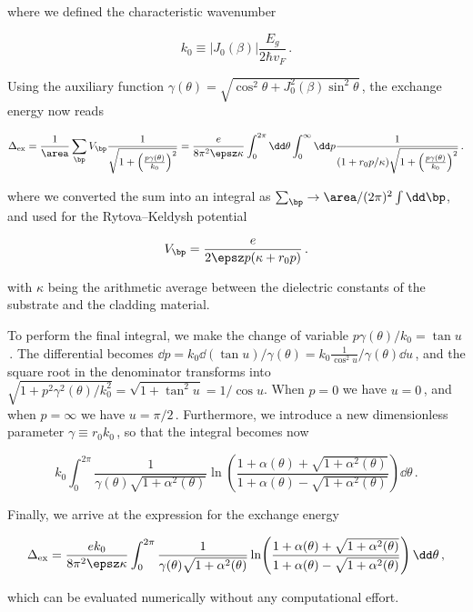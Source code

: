 \noindent where we defined the characteristic wavenumber

\begin{equation}
    k_0 \equiv |J_0 (\beta)| \frac{E_g}{2 \hbar v_F} \,.
\end{equation}

Using the auxiliary function $\gamma(\theta) = \sqrt{\cos^2 \theta + J_0^2(\beta) \sin^2 \theta}$\,, the exchange energy now reads

\begin{equation}
    \Delta_{\mathrm{ex}} = \frac{1}{\area} \sum_{\bp} V_{\bp}  \frac{1}{\sqrt{1 + \left(\frac{p \gamma(\theta)}{k_0}\right)^2}} = \frac{e}{8 \pi^2 \epsz \kappa} \int_0^{2\pi} \dd \theta \int_0^{\infty} \dd p  \frac{1}{ (1 + r_0 p/\kappa) \sqrt{1 + \left(\frac{p \gamma(\theta)}{k_0}\right)^2}} \,.
\end{equation}

\noindent where we converted the sum into an integral as $\sum_{\bp} \to \area/(2 \pi)^2  \int \dd \bp$, and used for the Rytova--Keldysh potential

\begin{equation}
    V_{\bp} = \frac{e}{2 \epsz p (\kappa + r_0 p)} \,.
\end{equation}

\noindent with $\kappa$ being the arithmetic average between the dielectric constants of the substrate and the cladding material.


\noindent To perform the final integral, we make the change of variable $p \gamma(\theta) / k_0 = \tan u$\,.
The differential becomes $ \dd p = k_0 \dd(\tan u)/\gamma(\theta) = k_0 \frac{1}{\cos^2 u}/\gamma(\theta) \dd u$\,, and the square root in the denominator transforms into $\sqrt{1 + p^2 \gamma^2(\theta)/k_0^2} = \sqrt{1 + \tan^2 u} = 1/\cos u$.
When $p=0$ we have $u=0$\,, and when $p = \infty$ we have $u=\pi/2$\,.
Furthermore, we introduce a new dimensionless parameter $\gamma \equiv r_0 k_0$\,, so that the integral becomes now

\begin{equation}
    k_0 \int_0^{2\pi} \frac{1}{\gamma(\theta) \sqrt{1 + \alpha^2(\theta)}} \ln\! \left( \frac{1 + \alpha(\theta) + \sqrt{1 + \alpha^2(\theta)}}{1 + \alpha(\theta) - \sqrt{1 + \alpha^2(\theta)}} \right) \dd \theta \,.
\end{equation}

\noindent Finally, we arrive at the expression for the exchange energy

\begin{equation}
    \Delta_{\mathrm{ex}} = \frac{e k_0}{8 \pi^2 \epsz \kappa} \int_0^{2\pi} \frac{1}{\gamma(\theta) \sqrt{1 + \alpha^2(\theta)}} \ln \! \left( \frac{1 + \alpha(\theta) + \sqrt{1 + \alpha^2(\theta)}}{1 + \alpha(\theta) - \sqrt{1 + \alpha^2(\theta)}} \right) \dd \theta \,,
\end{equation}

\noindent which can be evaluated numerically without any computational effort.

